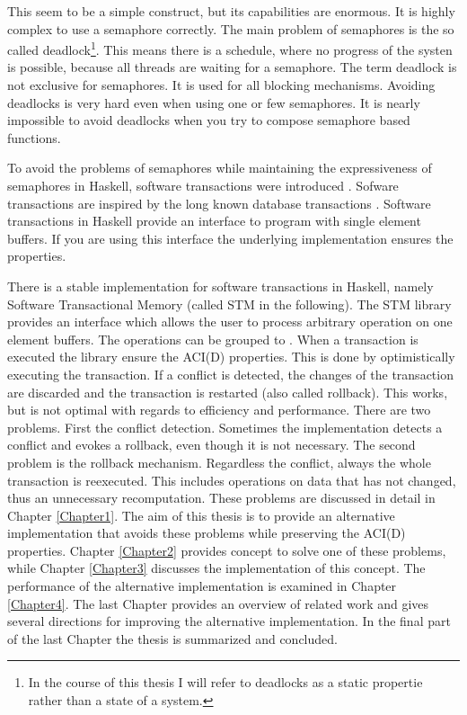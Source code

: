 This seem to be a simple construct, but its capabilities are enormous. It is highly complex to use a semaphore correctly.
The main problem of semaphores is the so called deadlock\footnote{In the course of this thesis I will refer to deadlocks as a static propertie rather than a state of a system.}. 
This means there is a schedule, where no progress of the systen is possible, because all threads are waiting for a semaphore. The term deadlock is not exclusive for semaphores.
It is used for all blocking mechanisms. Avoiding deadlocks is very hard even when using one or few semaphores. 
It is nearly impossible to avoid deadlocks when you try to compose semaphore based functions.

To avoid the problems of semaphores while maintaining the expressiveness of semaphores in Haskell, software transactions were introduced \parencite{STMBase}.
Sofware transactions are inspired by the long known database transactions \parencite{DBTrans}. Software transactions in Haskell provide an interface to program with 
single element buffers. If you are using this interface the underlying implementation ensures the  properties.  

There is a stable implementation for software transactions in Haskell, namely Software Transactional Memory (called STM in the following). The STM library provides 
an interface which allows the user to process arbitrary operation on one element buffers. The operations can be grouped to .
When a transaction is executed the library ensure the ACI(D) properties. This is done by optimistically executing the transaction.  
If a conflict is detected, the changes of the transaction are discarded and the transaction is restarted (also called rollback). 
This works, but is not optimal with regards to efficiency and performance. There are two problems. First the conflict detection. Sometimes the implementation detects 
a conflict and evokes a rollback, even though it is not necessary. The second problem is the rollback mechanism. Regardless the conflict, always the whole transaction
is reexecuted. This includes operations on data that has not changed, thus an unnecessary recomputation. These problems are discussed in detail in Chapter \ref{Chapter1}. 
The aim of this thesis is to provide an alternative implementation that avoids these problems while preserving the ACI(D) properties. Chapter \ref{Chapter2} provides 
concept to solve one of these problems, while Chapter \ref{Chapter3} discusses the implementation of this concept. The performance of the alternative implementation is 
examined in Chapter \ref{Chapter4}. The last Chapter provides an overview of related work and gives several directions for improving the alternative implementation. 
In the final part of the last Chapter the thesis is summarized and concluded.
